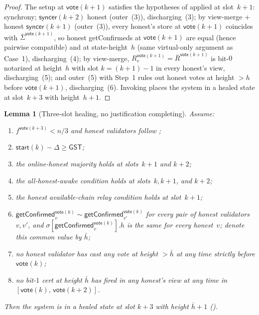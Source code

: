 \documentclass{article}
\newcommand{\syncer}{\mathsf{syncer}}
\newcommand{\start}{\mathsf{start}}
\newcommand{\vote}{\mathsf{vote}}
\newcommand{\comm}[1]{\bar{#1}}
\newcommand{\getConfirmed}{\textsf{getConfirmed}\xspace}
\theoremstyle{plain}
\newtheorem{lemma}{Lemma}
\theoremstyle{definition}
\theoremstyle{remark}
\newcommand{\GST}{\ensuremath{\mathsf{GST}}}
\newcommand{\OHM}{online-honest majority\xspace}
\newcommand{\HAR}{honest available-chain relay\xspace}
\newcommand{\AHA}{all-honest-awake\xspace}
\begin{document}
\begin{proof}
The setup at $\vote(k+1)$ satisfies the hypotheses of  applied at slot~$k+1$: synchrony; $\syncer(k+2)$ honest (outer~(3)), discharging~(3); by view-merge + honest $\syncer(k+1)$ (outer~(3)), every honest's store at $\vote(k+1)$ coincides with $\comm{\Sigma}^{\vote(k+1)}$, so honest \getConfirmed{}s at $\vote(k+1)$ are equal (hence pairwise compatible) and at state-height~$h$ (same virtual-only argument as Case~1), discharging~(4); by view-merge, $R_v^{\vote(k+1)} = \comm{R}^{\vote(k+1)}$ is bit-$0$ notarized at height~$h$ with slot $k = (k+1)-1$ in every honest's view, discharging~(5); and outer~(5) with Step~1 rules out honest votes at height $>h$ before $\vote(k+1)$, discharging~(6). Invoking  places the system in a healed state at slot~$k+3$ with height~$h+1$.
\end{proof}

\begin{lemma}[Three-slot healing, no justification completing]\label{rev:lem:healing-three-slot-no-just}
Assume:
\begin{enumerate}
  \item $f^{\vote(k+3)} < n/3$ and honest validators follow ;
  \item $\start(k) - \Delta \geq \GST$;
  \item the \OHM holds at slots~$k+1$ and $k+2$;
  \item the \AHA condition holds at slots~$k, k+1$, and $k+2$;
  \item the \HAR condition holds at slot~$k+1$;
  \item $\getConfirmed_v^{\vote(k)} \sim \getConfirmed_{v'}^{\vote(k)}$ for every pair of honest validators~$v, v'$, and $\sigma[\getConfirmed_v^{\vote(k)}].h$ is the same for every honest~$v$; denote this common value by $\comm{h}$;
  \item no honest validator has cast any vote at height $> \comm{h}$ at any time strictly before $\vote(k)$;
  \item no bit-$1$ cert at height $\comm{h}$ has fired in any honest's view at any time in $[\vote(k),\, \vote(k+2)]$.
\end{enumerate}
Then the system is in a healed state at slot $k+3$ with height $\comm{h}+1$ ().
\end{lemma}
\end{document}

